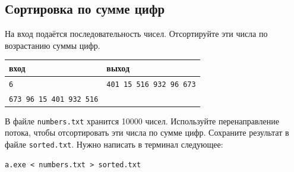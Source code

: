 \documentclass[10pt]{article}
\begin{document}
\subsection{Сортировка по сумме цифр}
На вход подаётся последовательность чисел. Отсортируйте эти числа по возрастанию суммы цифр.
\begin{center}
\begin{tabular}{ l | l }
 вход & выход \\ \hline
 \texttt{6} & \texttt{401 15 516 932 96 673}  \\  
 \texttt{673 96 15 401 932 516} &  \\
\end{tabular}
\end{center}
В файле \texttt{numbers.txt} хранится 10000 чисел. Используйте перенаправление потока, чтобы отсортировать эти числа по сумме цифр. Сохраните результат в файле \texttt{sorted.txt}. Нужно написать в терминал следующее:

\begin{verbatim}
a.exe < numbers.txt > sorted.txt
\end{verbatim}
\end{document}

